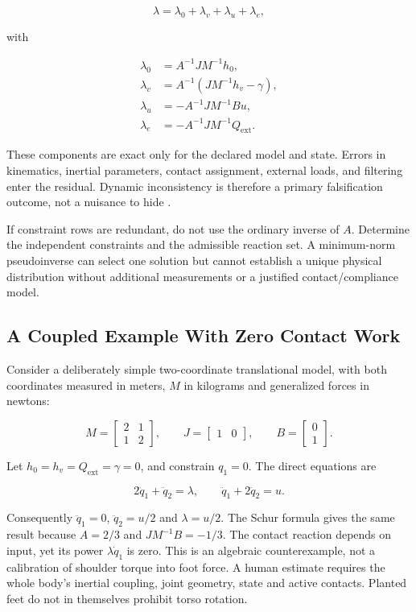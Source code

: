 \[
\lambda=\lambda_0+\lambda_v+\lambda_u+\lambda_e,
\]

with

\[
\begin{aligned}
\lambda_0&=A^{-1}JM^{-1}h_0,\\
\lambda_v&=A^{-1}(JM^{-1}h_v-\gamma),\\
\lambda_u&=-A^{-1}JM^{-1}Bu,\\
\lambda_e&=-A^{-1}JM^{-1}Q_{\mathrm{ext}}.
\end{aligned}
\]

These components are exact only for the declared model and state. Errors in kinematics, inertial parameters, contact assignment, external loads, and filtering enter the residual. Dynamic inconsistency is therefore a primary falsification outcome, not a nuisance to hide \citep{sturdy2022, werling2023}.

If constraint rows are redundant, do not use the ordinary inverse of \(A\). Determine the independent constraints and the admissible reaction set. A minimum-norm pseudoinverse can select one solution but cannot establish a unique physical distribution without additional measurements or a justified contact/compliance model.

\subsection{A Coupled Example With Zero Contact Work}\label{sec:grf-remote-torques}\label{grf-a-coupled-example-with-zero-contact-work}

Consider a deliberately simple two-coordinate translational model, with both coordinates measured in meters, \(M\) in kilograms and generalized forces in newtons:

\[
M=\begin{bmatrix}2&1\\1&2\end{bmatrix},\qquad
J=\begin{bmatrix}1&0\end{bmatrix},\qquad
B=\begin{bmatrix}0\\1\end{bmatrix}.
\]

Let \(h_0=h_v=Q_{\mathrm{ext}}=\gamma=0\), and constrain \(q_1=0\). The direct equations are

\[
2\ddot q_1+\ddot q_2=\lambda,\qquad
\ddot q_1+2\ddot q_2=u.
\]

Consequently \(\ddot q_1=0\), \(\ddot q_2=u/2\) and \(\lambda=u/2\). The Schur formula gives the same result because \(A=2/3\) and \(JM^{-1}B=-1/3\). The contact reaction depends on input, yet its power \(\lambda\dot q_1\) is zero. This is an algebraic counterexample, not a calibration of shoulder torque into foot force. A human estimate requires the whole body's inertial coupling, joint geometry, state and active contacts. Planted feet do not in themselves prohibit torso rotation.


